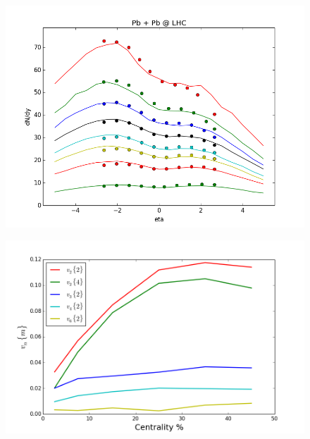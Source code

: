 \documentclass[aps,prl,twocolumn,groupedaddress]{revtex4-1}
\begin{document}
	\begin{figure}
  	\centering
	\includegraphics[width=\columnwidth]{pics/RUN-1-pPb-dNdy-eta.png}
	\caption{}
  	\label{pPb-dNdy-calc}
	\end{figure}
	
	\begin{figure}
  	\centering
	\includegraphics[width=\columnwidth]{pics/new-PbPb-vnm-p1.png}	
	\caption{}
  	\label{PbPb-vn-calc}
	\end{figure}
	
\end{document}
